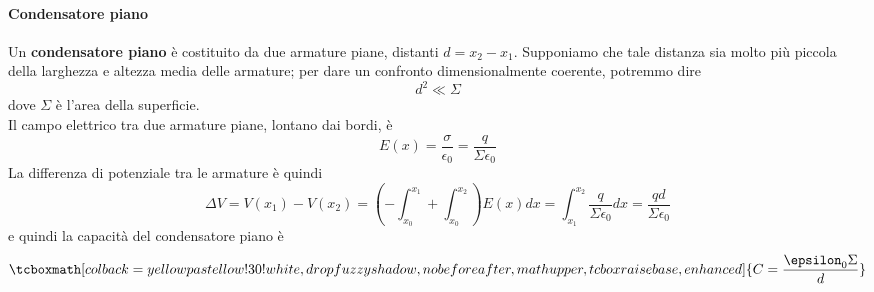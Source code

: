 \paragraph{Condensatore piano}
Un \textbf{condensatore piano} è costituito da due armature piane, distanti $d=x_2-x_1$. Supponiamo che tale distanza sia molto più piccola della larghezza e altezza media delle armature; per dare un confronto dimensionalmente coerente, potremmo dire
\begin{equation}
	d^2\ll \Sigma
\end{equation}
dove $\Sigma$ è l'area della superficie.\\
Il campo elettrico tra due armature piane, lontano dai bordi, è%
\begin{equation*}
	E(x)=\frac{\sigma}{\epsilon_0}=\frac{q}{\Sigma \epsilon_0}
\end{equation*}
La differenza di potenziale tra le armature è quindi
\begin{equation*}
	\Delta V=V(x_1)-V(x_2)=\left(-\int_{x_0}^{x_1}+\int_{x_0}^{x_2}\right)E(x)dx=\int_{x_1}^{x_2}\frac{q}{\Sigma \epsilon_0}dx=\frac{qd}{\Sigma \epsilon_0}
\end{equation*}
e quindi la capacità del condensatore piano è
\begin{equation}
	\tcboxmath[colback=yellowpastellow!30!white,drop fuzzy shadow, nobeforeafter, math upper, tcbox raise base, enhanced]{C=\frac{\epsilon_0\Sigma}{d}}
\end{equation}
